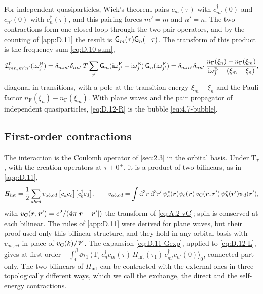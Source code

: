 For independent quasiparticles, Wick's theorem pairs $c_m(\tau)$ with $c^\dagger_{m'}(0)$ and $c_{n'}(0)$ with $c^\dagger_n(\tau)$, and this pairing forces $m' = m$ and $n' = n$. The two contractions form one closed loop through the two pair operators, and by the counting of \cref{app:D.11} the result is $\mathsf{G}_m(\tau)\mathsf{G}_n(-\tau)$. The transform of this product is the frequency sum \cref{eq:D.10-sum},
\begin{equation}
  \mathfrak{L}^0_{mn,m'n'}(\mathrm{i}\omega^{\mathrm{B}}_j) = \delta_{mm'}\delta_{nn'}\,T\sum_{j'}\mathsf{G}_m(\mathrm{i}\omega^{\mathrm{F}}_{j'} + \mathrm{i}\omega^{\mathrm{B}}_j)\,\mathsf{G}_n(\mathrm{i}\omega^{\mathrm{F}}_{j'})
  = \delta_{mm'}\delta_{nn'}\,\frac{n_{\mathrm{F}}(\xi_n) - n_{\mathrm{F}}(\xi_m)}{\mathrm{i}\omega^{\mathrm{B}}_j - (\xi_m - \xi_n)} ,
  \label{eq:D.12-L0}
\end{equation}
diagonal in transitions, with a pole at the transition energy $\xi_m - \xi_n$ and the Pauli factor $n_{\mathrm{F}}(\xi_n) - n_{\mathrm{F}}(\xi_m)$. With plane waves and the pair propagator of independent quasiparticles, \cref{eq:D.12-R} is the bubble \cref{eq:4.7-bubble}.

\subsection*{First-order contractions}

The interaction is the Coulomb operator of \cref{sec:2.3} in the orbital basis. Under $\mathrm{T}_\tau$, with the creation operators at $\tau + 0^+$, it is a product of two bilinears, as in \cref{app:D.11},
\begin{equation*}
  H_{\mathrm{int}} = \frac12\sum_{abcd}v_{ab,cd}\,\bigl[c^\dagger_ac_c\bigr]\bigl[c^\dagger_bc_d\bigr], \qquad
  v_{ab,cd} = \int\mathrm{d}^3r\,\mathrm{d}^3r'\,\psi_a^*(\bm{r})\psi_c(\bm{r})\,v_{\mathrm{C}}(\bm{r},\bm{r}')\,\psi_b^*(\bm{r}')\psi_d(\bm{r}') ,
\end{equation*}
with $v_{\mathrm{C}}(\bm{r},\bm{r}') = e^2/(4\pi|\bm{r} - \bm{r}'|)$ the transform of \cref{eq:A.2-vC}; spin is conserved at each bilinear. The rules of \cref{app:D.11} were derived for plane waves, but their proof used only this bilinear structure, and they hold in any orbital basis with $v_{ab,cd}$ in place of $v_{\mathrm{C}}(k)/\mathscr{V}$. The expansion \cref{eq:D.11-Gexp}, applied to \cref{eq:D.12-L}, gives at first order $+\int_0^\beta\dd\tau_1\,\langle\mathrm{T}_\tau\,c^\dagger_nc_m(\tau)\,H_{\mathrm{int}}(\tau_1)\,c^\dagger_{m'}c_{n'}(0)\rangle_0$, connected part only. The two bilinears of $H_{\mathrm{int}}$ can be contracted with the external ones in three topologically different ways, which we call the exchange, the direct and the self-energy contractions.

